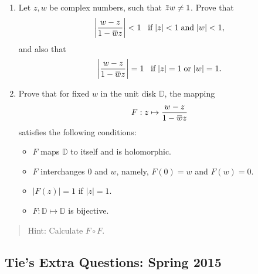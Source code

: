 \begin{problem}[?]

\begin{enumerate}
\def\labelenumi{\alph{enumi}.}
\item
  Let \(z, w\) be complex numbers, such that
  \(\mkern 1.5mu\overline{\mkern-1.5muz\mkern-1.5mu}\mkern 1.5mu w \neq 1\).
  Prove that
  \begin{align*}{\left\lvert {\frac{w - z}{1 - \mkern 1.5mu\overline{\mkern-1.5muw\mkern-1.5mu}\mkern 1.5mu z}} \right\rvert} < 1 \; \; \; \mbox{if} \; |z| < 1 \; \mbox{and}\; |w| < 1,\end{align*}
  and also that
  \begin{align*}{\left\lvert {\frac{w - z}{1 - \mkern 1.5mu\overline{\mkern-1.5muw\mkern-1.5mu}\mkern 1.5mu z}} \right\rvert} = 1 \; \; \; \mbox{if} \; |z| = 1 \; \mbox{or}\; |w| = 1.\end{align*}
\item
  Prove that for fixed \(w\) in the unit disk \(\mathbb D\), the mapping
  \begin{align*}F: z \mapsto \frac{w - z}{1 - \mkern 1.5mu\overline{\mkern-1.5muw\mkern-1.5mu}\mkern 1.5mu z}\end{align*}
  satisfies the following conditions:

  \begin{itemize}
  \item
    \(F\) maps \(\mathbb D\) to itself and is holomorphic.~
  \item
    \(F\) interchanges \(0\) and \(w\), namely, \(F(0) = w\) and
    \(F(w) = 0\).
  \item
    \({\left\lvert {F(z)} \right\rvert} = 1\) if \(|z| = 1\).
  \item
    \(F: {\mathbb D} \mapsto {\mathbb D}\) is bijective.
  \end{itemize}
\end{enumerate}

\begin{quote}
Hint: Calculate \(F \circ F\).
\end{quote}

\end{problem}

\hypertarget{ties-extra-questions-spring-2015-7}{%
\subsection{Tie's Extra Questions: Spring
2015}\label{ties-extra-questions-spring-2015-7}}

